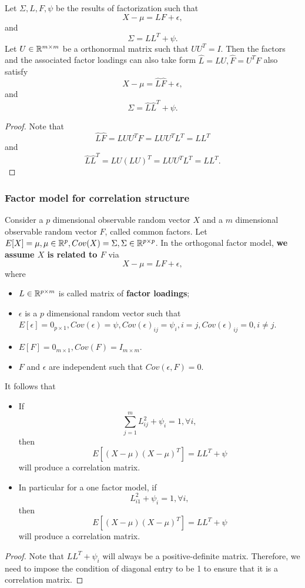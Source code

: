 \begin{refsection}
\begin{lemma}\cite[573]{anderson2009introduction}\cite[488,504]{johnson2007applied}
Let $\Sigma, L,F, \psi$ be the results of factorization such that
$$X-\mu = LF + \epsilon,$$
and
$$\Sigma = LL^T + \psi. $$
Let $U \in \mathbb{R}^{m\times m}$ be a orthonormal matrix such that $UU^T = I$. Then the factors and the associated factor loadings can also take form 
$\hat{L} = LU, \hat{F} = U^TF$ also satisfy
$$X-\mu = \hat{L}\hat{F} + \epsilon,$$
and
 	$$\Sigma = \hat{L}\hat{L}^T + \psi. $$
\end{lemma}
\begin{proof}
Note that	
$$\hat{L}\hat{F} = LUU^TF = LUU^TL^T = LL^T$$
and
$$\hat{L}\hat{L}^T = LU(LU)^T = LUU^TL^T = LL^T.$$	
\end{proof}

\subsubsection{Factor model for correlation structure}

\begin{lemma}\label{ch:statistical-models:th:ConditionForCorrelationStructureFactorModel}
Consider a $p$ dimensional observable random vector $X$ and a $m$ dimensional observable random vector $F$, called common factors. Let $E[X] = \mu, \mu\in \mathbb{R}^p, Cov(X) = \Sigma,\Sigma\in\mathbb{R}^{p\times p}$. 
In the orthogonal factor model, \textbf{we assume $X$ is related to $F$} via
$$X - \mu = L F + \epsilon,$$
where 
\begin{itemize}
	\item $L\in \mathbb{R}^{p\times m}$ is called matrix of \textbf{factor loadings};
	\item $\epsilon$ is a $p$ dimensional random vector such that $E[\epsilon] = 0_{p\times 1}, Cov(\epsilon) = \psi, Cov(\epsilon)_{ij} = \psi_{i}, i = j, Cov(\epsilon)_{ij} = 0, i\neq j$.
	\item $E[F] = 0_{m\times 1}, Cov(F) = I_{m\times m}.$
	\item $F$ and $\epsilon$ are independent such that $Cov(\epsilon, F) = 0$.
\end{itemize}

It follows that
\begin{itemize}
	\item If 
	$$\sum_{j=1}^m L_{ij}^2 + \psi_i = 1, \forall i,$$
	then $$E[(X-\mu)(X-\mu)^T] = LL^T + \psi$$ will produce a correlation matrix.
	\item In particular for a one factor model, if
	$$ L_{i1}^2 + \psi_i = 1, \forall i,$$
	then $$E[(X-\mu)(X-\mu)^T] = LL^T + \psi$$ will produce a correlation matrix.
\end{itemize}	
\end{lemma}
\begin{proof}
Note that
	$LL^T + \psi_i$ will always be a positive-definite matrix. Therefore, we need to impose the condition of diagonal entry to be 1 to ensure that it is a correlation matrix.
\end{proof}



\end{refsection}
